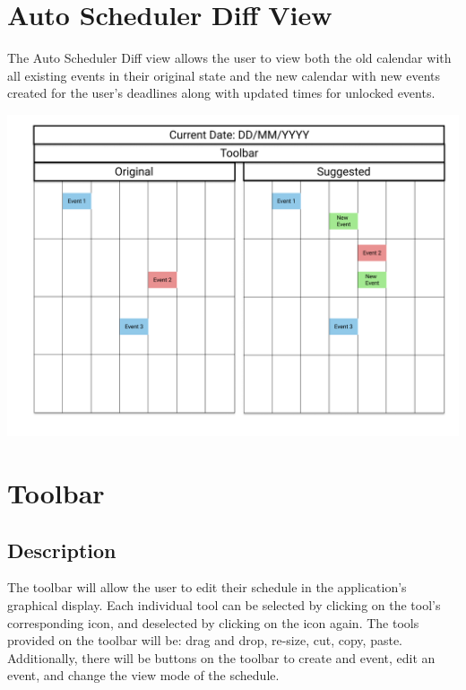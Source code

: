 \documentclass{scrreprt}
\begin{document}
\section{Auto Scheduler Diff View}
The Auto Scheduler Diff view allows the user to view both the old calendar with all existing events in their original state and the new calendar with new events created for the user's deadlines along with updated times for unlocked events.\\

\begin{center}
\includegraphics[width=\textwidth]{diff.png}
\end{center}

\section{Toolbar}

\subsection{Description}
The toolbar will allow the user to edit their schedule in the application's graphical display.
Each individual tool can be selected by clicking on the tool's corresponding icon, and deselected by clicking on the icon again. The tools provided on the toolbar will be: drag and drop, re-size, cut, copy, paste. Additionally, there will be buttons on the toolbar to create and event, edit an event, and change the view mode of the schedule.
\end{document}
